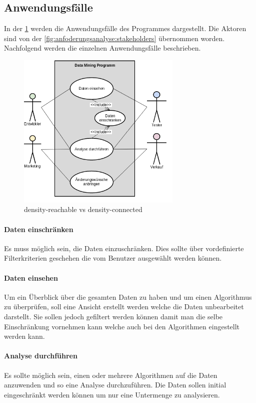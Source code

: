 \subsection{Anwendungsfälle}
\label{sec:anforderungsanalyse:anwendungsfaelle}
In der \cref{fig:anfoderungsanalyse:anwendungsfaelle:1} werden die Anwendungsfälle des Programmes dargestellt. Die Aktoren sind von der \cref{fig:anfoderungsanalyse:stakeholders} übernommen worden. Nachfolgend werden die einzelnen Anwendungsfälle beschrieben.
\begin{figure}[H]
	\RawFloats
	\centering
	\includegraphics[width=0.7\textwidth]{images/usecase}
	\caption{density-reachable vs density-connected}
	\label{fig:anfoderungsanalyse:anwendungsfaelle:1}
\end{figure}

\paragraph{Daten einschränken} Es muss möglich sein, die Daten einzuschränken. Dies sollte über vordefinierte Filterkriterien geschehen die vom Benutzer ausgewählt werden können.

\paragraph{Daten einsehen} Um ein Überblick über die gesamten Daten zu haben und um einen Algorithmus zu überprüfen, soll eine Ansicht erstellt werden welche die Daten unbearbeitet darstellt. Sie sollen jedoch gefiltert werden können damit man die selbe Einschränkung vornehmen kann welche auch bei den Algorithmen eingestellt werden kann.

\paragraph{Analyse durchführen} Es sollte möglich sein, einen oder mehrere Algorithmen auf die Daten anzuwenden und so eine Analyse durchzuführen. Die Daten sollen initial eingeschränkt werden können um nur eine Untermenge zu analysieren.

